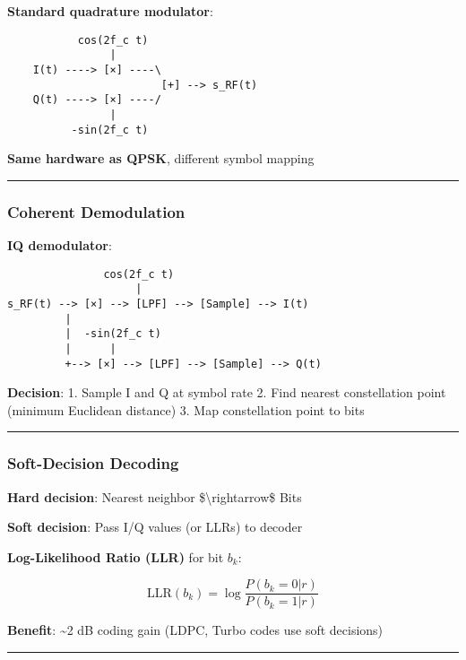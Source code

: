 \textbf{Standard quadrature modulator}:

\begin{verbatim}
           cos(2f_c t)
                |
    I(t) ----> [×] ----\
                        [+] --> s_RF(t)
    Q(t) ----> [×] ----/
                |
          -sin(2f_c t)
\end{verbatim}

\textbf{Same hardware as QPSK}, different symbol mapping

\begin{center}\rule{0.5\linewidth}{0.5pt}\end{center}

\subsubsection{Coherent Demodulation}\label{coherent-demodulation}

\textbf{IQ demodulator}:

\begin{verbatim}
               cos(2f_c t)
                    |
s_RF(t) --> [×] --> [LPF] --> [Sample] --> I(t)
         |
         |  -sin(2f_c t)
         |      |
         +--> [×] --> [LPF] --> [Sample] --> Q(t)
\end{verbatim}

\textbf{Decision}: 1. Sample I and Q at symbol rate 2. Find nearest
constellation point (minimum Euclidean distance) 3. Map constellation
point to bits

\begin{center}\rule{0.5\linewidth}{0.5pt}\end{center}

\subsubsection{Soft-Decision Decoding}\label{soft-decision-decoding}

\textbf{Hard decision}: Nearest neighbor \$\textbackslash rightarrow\$
Bits

\textbf{Soft decision}: Pass I/Q values (or LLRs) to decoder

\textbf{Log-Likelihood Ratio (LLR)} for bit \(b_k\):

\[
\text{LLR}(b_k) = \log\frac{P(b_k=0 | r)}{P(b_k=1 | r)}
\]

\textbf{Benefit}: \textasciitilde2 dB coding gain (LDPC, Turbo codes use
soft decisions)

\begin{center}\rule{0.5\linewidth}{0.5pt}\end{center}

